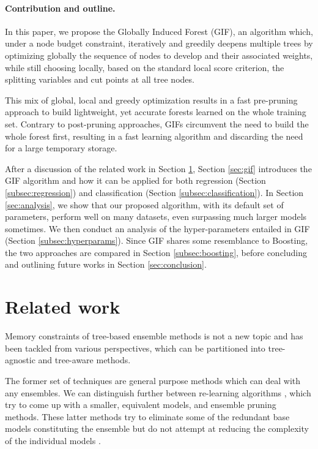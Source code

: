 \documentclass{article}
\begin{document}
\vspace*{-\baselineskip}

\paragraph{Contribution and outline.}
In this paper, we propose the Globally Induced Forest (GIF), an algorithm 
which, under a node budget constraint, iteratively and greedily deepens multiple 
trees by optimizing globally the sequence of nodes to develop and their 
associated weights, while still choosing locally, based on the standard local 
score criterion, the splitting variables and cut points at all tree nodes. 

This mix of global, local and greedy optimization results in a fast pre-pruning 
approach to build lightweight, yet accurate forests learned on the whole 
training set. Contrary to post-pruning approaches, GIFs circumvent the need to 
build the whole forest first, resulting in a fast learning algorithm and 
discarding the need for a large temporary storage.

After a discussion of the related work in Section \ref{sec:relatedWork},
Section \ref{sec:gif} introduces the GIF algorithm and how it can be applied
for both regression (Section \ref{subsec:regression}) and classification
(Section \ref{subsec:classification}).  In Section \ref{sec:analysis}, we show
that our proposed algorithm, with its default set of parameters, perform well
on many datasets, even surpassing much larger models sometimes. We then conduct
an analysis of the hyper-parameters entailed in GIF (Section
\ref{subsec:hyperparams}). Since GIF shares some resemblance to Boosting, the
two approaches are compared in Section \ref{subsec:boosting}, before concluding
and outlining future works in Section \ref{sec:conclusion}.


\section{Related work}
\label{sec:relatedWork}
Memory constraints of tree-based ensemble methods is not a new topic and has 
been tackled from various perspectives, which can be partitioned into 
tree-agnostic and tree-aware methods.

The former set of techniques are general purpose methods which can deal with
any ensembles. We can distinguish further between re-learning algorithms
\citep[e.g.][]{domingos1997oracle,menke2009oracle}, which try to come up with a
smaller, equivalent models, and ensemble pruning methods. These latter methods
try to eliminate some of the redundant base models constituting the ensemble
but do not attempt at reducing the complexity of the individual models \citep[see ][ for a review of these methods]{tsoumakas2008enspruning,rokach2016enspruning}.
\end{document}
